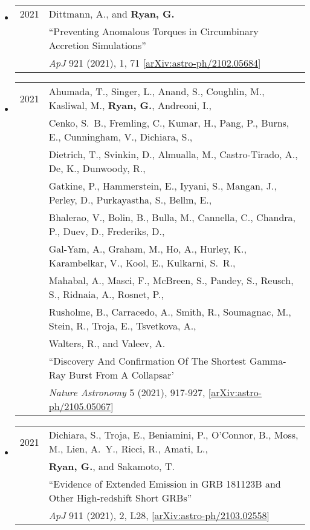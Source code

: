 \begin{itemize}
\item \begin{tabular}{ll}
2021 & {Dittmann}, A., and {\bf {Ryan}, G.}\\ 
	&``Preventing Anomalous Torques in Circumbinary Accretion Simulations''\\
	& \emph{ApJ} 921 (2021), 1, 71 [\href{https://arxiv.org/abs/2102.05684}{arXiv:astro-ph/2102.05684}]\\
\end{tabular}	

\item \begin{tabular}{ll}
2021 & {Ahumada}, T., {Singer}, L., {Anand}, S., {Coughlin}, M., {Kasliwal}, M., {\bf {Ryan}, G.}, {Andreoni}, I.,\\
	& {Cenko}, S.~B., {Fremling}, C., {Kumar}, H., {Pang}, P., {Burns}, E., {Cunningham}, V., {Dichiara}, S.,\\
	& {Dietrich}, T., {Svinkin}, D., {Almualla}, M., {Castro-Tirado}, A., {De}, K., {Dunwoody}, R., \\
	& {Gatkine}, P., {Hammerstein}, E., {Iyyani}, S., {Mangan}, J., {Perley}, D., {Purkayastha}, S., {Bellm}, E., \\
	& {Bhalerao}, V., {Bolin}, B., {Bulla}, M., {Cannella}, C., {Chandra}, P., {Duev}, D., {Frederiks}, D.,\\
	&  {Gal-Yam}, A., {Graham}, M., {Ho}, A., {Hurley}, K., {Karambelkar}, V., {Kool}, E., {Kulkarni}, S.~R.,\\
	&  {Mahabal}, A., {Masci}, F., {McBreen}, S., {Pandey}, S., {Reusch}, S., {Ridnaia}, A., {Rosnet}, P., \\
	& {Rusholme}, B., {Carracedo}, A., {Smith}, R., {Soumagnac}, M., {Stein}, R., {Troja}, E., {Tsvetkova}, A.,\\
	&  {Walters}, R., and {Valeev}, A.\\ 
	&``Discovery And Confirmation Of The Shortest Gamma-Ray Burst From A Collapsar'\\
	& \emph{Nature Astronomy} 5 (2021), 917-927, [\href{https://arxiv.org/abs/2105.05067}{arXiv:astro-ph/2105.05067}]\\
\end{tabular}	

\item \begin{tabular}{ll}
2021 & {Dichiara}, S., {Troja}, E., {Beniamini}, P., {O'Connor}, B., {Moss}, M., {Lien}, A.~Y., {Ricci}, R., {Amati}, L., \\
	& {\bf {Ryan}, G.}, and {Sakamoto}, T.\\
	& ``Evidence of Extended Emission in GRB 181123B and Other High-redshift Short GRBs''\\
	& \emph{ApJ} 911 (2021), 2, L28, [\href{https://arxiv.org/abs/2103.02558}{arXiv:astro-ph/2103.02558}]\\
\end{tabular}
	

\end{itemize}
